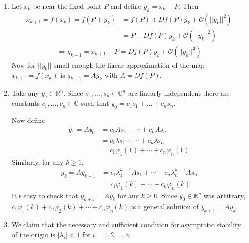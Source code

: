 \begin{solution}[3.1]
	\leavevmode
\begin{enumerate}
\item Let $x_k$ be near the fixed point $P$ and define $y_k = x_k - P$. Then
\begin{align}
	x_{k+1} = f(x_k) = f(P + y_k) &= f(P) + Df(P)y_k + \mathcal{O}(||y_k||^2) \\
	&= P + Df(P)y_k + \mathcal{O}(||y_k||^2)
\end{align}
\begin{align}
	\Longrightarrow y_{k+1} = x_{k+1} - P = Df(P)y_k + \mathcal{O}(||y_k||^2)
\end{align}
Now for $||y_k||$ small enough the linear approximation of the map $x_{k+1} = f(x_k)$ is $y_{k+1} = Ay_k$ with $A = Df(P)$.


\item Take any $y_0 \in \mathbb{R}^n$. Since $s_1,\ldots ,s_n \in \mathbb{C}^n$ are linearly independent there are constants $c_1,\ldots ,c_n \in \mathbb{C}$ such that $y_0 = c_1s_1+\ldots+c_ns_n$.

Now define
\begin{align}
	y_1 = Ay_0 &= c_1As_1 + \cdots + c_nAs_n \\
	&= c_1\lambda s_1 + \cdots + c_n\lambda s_n \\
	&= c_1\varphi_1(1) + \cdots + c_n \varphi_n(1)
\end{align}
Similarly, for any $k \geq 1$,
\begin{align}
	y_k = Ay_{k-1} &= c_1 \lambda_1^{k-1}As_1 + \cdots + c_n \lambda_n^{k-1}As_n  \\
	&= c_1\varphi_1(k) + \cdots + c_n \varphi_n(k)
\end{align}
It's easy to check that $y_{k+1} = Ay_k$ for any $k \geq 0$. Since $y_0 \in \mathbb{R}^n$ was arbitrary, $c_1\varphi_1(k)+c_2\varphi_2(k) + \cdots + c_n\varphi_n(k)$ is a general solution of $y_{k+1} = Ay_k$.


\item We claim that the necessary and sufficient condition for asymptotic stability of the origin is $|\lambda_i|<1$ for $i=1,2,\ldots , n$


\end{enumerate}
\end{solution}
